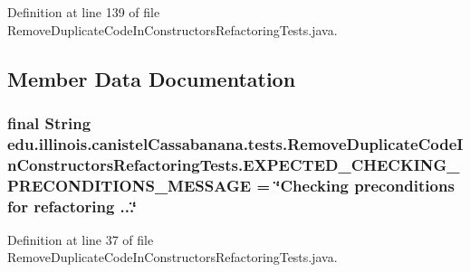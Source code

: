 Definition at line 139 of file RemoveDuplicateCodeInConstructorsRefactoringTests.java.



\subsection{Member Data Documentation}
\hypertarget{classedu_1_1illinois_1_1canistelCassabanana_1_1tests_1_1RemoveDuplicateCodeInConstructorsRefactoringTests_a734c5cd6b9cd1e88c2ab61ae597d66a8}{
\subsubsection[{EXPECTED\_\-CHECKING\_\-PRECONDITIONS\_\-MESSAGE}]{\setlength{\rightskip}{0pt plus 5cm}final String {\bf edu.illinois.canistelCassabanana.tests.RemoveDuplicateCodeInConstructorsRefactoringTests.EXPECTED\_\-CHECKING\_\-PRECONDITIONS\_\-MESSAGE} = \char`\"{}Checking preconditions for refactoring ...\char`\"{}}}
\label{classedu_1_1illinois_1_1canistelCassabanana_1_1tests_1_1RemoveDuplicateCodeInConstructorsRefactoringTests_a734c5cd6b9cd1e88c2ab61ae597d66a8}


Definition at line 37 of file RemoveDuplicateCodeInConstructorsRefactoringTests.java.


